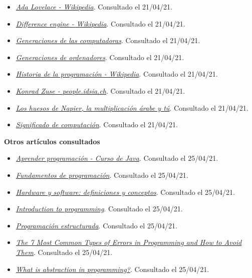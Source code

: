 \documentclass[
]{book}
\providecommand{\tightlist}{%
  \setlength{\itemsep}{0pt}\setlength{\parskip}{0pt}}
\begin{document}
\begin{itemize}
\tightlist
\item
  \href{https://es.wikipedia.org/wiki/Ada_Lovelace}{\emph{Ada Lovelace - Wikipedia}}. Consultado el 21/04/21.
\item
  \href{https://en.wikipedia.org/wiki/Difference_engine}{\emph{Difference engine - Wikipedia}}. Consultado el 21/04/21.
\item
  \href{https://www.nextu.com/blog/generaciones-de-las-computadoras/}{\emph{Generaciones de las computadoras}}. Consultado el 21/04/21.
\item
  \href{https://www.profesionalreview.com/2018/10/13/generaciones-de-ordenadores/}{\emph{Generaciones de ordenadores}}. Consultado el 21/04/21.
\item
  \href{https://es.wikipedia.org/wiki/Anexo:Historia_de_la_computaci\%C3\%B3n}{\emph{Historia de la programación - Wikipedia}}. Consultado el 21/04/21.
\item
  \href{https://people.idsia.ch/~juergen/zuse.html}{\emph{Konrad Zuse - people.idsia.ch}}. Consultado el 21/04/21.
\item
  \href{https://culturacientifica.com/2016/10/05/los-huesos-napier-la-multiplicacion-arabe/\#:~:text=Los\%20huesos\%20de\%20Napier\%2C\%20tambi\%C3\%A9n,de\%20las\%20tablas\%20de\%20multiplicar}{\emph{Los huesos de Napier, la multiplicación árabe y tú}}. Consultado el 21/04/21.
\item
  \href{https://www.significados.com/computacion/}{\emph{Significado de computación}}. Consultado el 21/04/21.
\end{itemize}

\textbf{Otros artículos consultados}

\begin{itemize}
\tightlist
\item
  \href{https://www.aprenderprogramacion.com.ar/2020/03/1-breve-historia-de-la-programacion.html}{\emph{Aprender programación - Curso de Java}}. Consultado el 25/04/21.
\item
  \href{http://www.utn.edu.ec/reduca/programacion/fundamentos/fundamentos_de_programacin.html}{\emph{Fundamentos de programación}}. Consultado el 25/04/21.
\item
  \href{https://www.profesionalreview.com/2019/11/10/hardware-software-definiciones/}{\emph{Hardware y software: definiciones y conceptos}}. Consultado el 25/04/21.
\item
  \href{https://www.bbc.co.uk/bitesize/guides/zts8d2p/revision/1}{\emph{Introduction to programming}}. Consultado el 25/04/21.
\item
  \href{http://www1.frm.utn.edu.ar/informatica1/VIANI/PROGRAMACION\%20ESTRUCTURADA/PROGRAMACION\%20ESTRUCTURADA.PDF}{\emph{Programación estructurada}}. Consultado el 25/04/21.
\item
  \href{https://textexpander.com/blog/the-7-most-common-types-of-errors-in-programming-and-how-to-avoid-them}{\emph{The 7 Most Common Types of Errors in Programming and How to Avoid Them}}. Consultado el 25/04/21.
\item
  \href{https://levelup.gitconnected.com/what-is-abstraction-in-programming-2f35c8c72e15}{\emph{What is abstraction in programming?}}. Consultado el 25/04/21.
\end{itemize}
\end{document}
